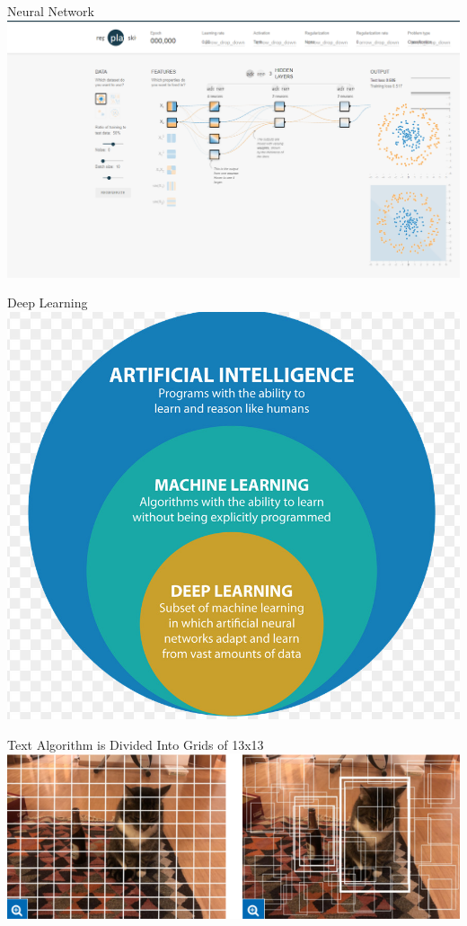 \documentclass{beamer}{}
\begin{document}
    \begin{frame} {Neural Network}
        \center\includegraphics[width=\textwidth]{img/3.png}
    \end{frame}
    \begin{frame} {Deep Learning}
        \center\includegraphics[width=\textwidth]{img/6.png}
    \end{frame}
    \begin{frame} {Text Algorithm is Divided Into Grids of 13x13}
        \center\includegraphics[width=\textwidth]{img/5.png}
    \end{frame}
\end{document}

